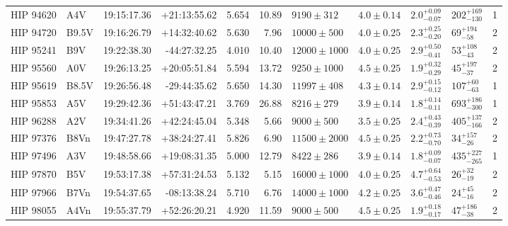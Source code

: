 \begin{landscape}
\begin{scriptsize}
\begin{longtable}{|l|lrrrrlllll|}
   HIP 94620 &      A4V &    19:15:17.36 &   +21:13:55.62 &   5.654 &     10.89 &    $9190 \pm 312$ &  $4.0 \pm 0.14$ &  $2.0^{+0.09}_{-0.07}$ &   $202^{+169}_{-130}$ &       1 \\
   HIP 94720 &    B9.5V &    19:16:26.79 &   +14:32:40.62 &   5.630 &      7.96 &   $10000 \pm 500$ &  $4.0 \pm 0.25$ &  $2.3^{+0.25}_{-0.20}$ &     $69^{+194}_{-58}$ &       2 \\
   HIP 95241 &      B9V &    19:22:38.30 &   -44:27:32.25 &   4.010 &     10.40 &  $12000 \pm 1000$ &  $4.0 \pm 0.25$ &  $2.9^{+0.50}_{-0.41}$ &     $53^{+108}_{-43}$ &       2 \\
   HIP 95560 &      A0V &    19:26:13.25 &   +20:05:51.84 &   5.594 &     13.72 &   $9250 \pm 1000$ &  $4.5 \pm 0.25$ &  $1.9^{+0.32}_{-0.29}$ &     $45^{+197}_{-37}$ &       2 \\
   HIP 95619 &    B8.5V &    19:26:56.48 &   -29:44:35.62 &   5.650 &     14.30 &   $11997 \pm 408$ &  $4.3 \pm 0.14$ &  $2.9^{+0.15}_{-0.12}$ &     $107^{+60}_{-63}$ &       1 \\
   HIP 95853 &      A5V &    19:29:42.36 &   +51:43:47.21 &   3.769 &     26.88 &    $8216 \pm 279$ &  $3.9 \pm 0.14$ &  $1.8^{+0.14}_{-0.11}$ &   $693^{+186}_{-300}$ &       1 \\
   HIP 96288 &      A2V &    19:34:41.26 &   +42:24:45.04 &   5.348 &      5.66 &    $9000 \pm 500$ &  $3.5 \pm 0.25$ &  $2.4^{+0.43}_{-0.39}$ &   $405^{+137}_{-166}$ &       2 \\
   HIP 97376 &     B8Vn &    19:47:27.78 &   +38:24:27.41 &   5.826 &      6.90 &  $11500 \pm 2000$ &  $4.5 \pm 0.25$ &  $2.2^{+0.73}_{-0.70}$ &     $34^{+157}_{-26}$ &       2 \\
   HIP 97496 &      A3V &    19:48:58.66 &   +19:08:31.35 &   5.000 &     12.79 &    $8422 \pm 286$ &  $3.9 \pm 0.14$ &  $1.8^{+0.09}_{-0.07}$ &   $435^{+227}_{-265}$ &       1 \\
   HIP 97870 &      B5V &    19:53:17.38 &   +57:31:24.53 &   5.132 &      5.15 &  $16000 \pm 1000$ &  $4.0 \pm 0.25$ &  $4.7^{+0.64}_{-0.53}$ &      $26^{+32}_{-19}$ &       2 \\
   HIP 97966 &     B7Vn &    19:54:37.65 &   -08:13:38.24 &   5.710 &      6.76 &  $14000 \pm 1000$ &  $4.2 \pm 0.25$ &  $3.6^{+0.47}_{-0.46}$ &      $24^{+45}_{-16}$ &       2 \\
   HIP 98055 &     A4Vn &    19:55:37.79 &   +52:26:20.21 &   4.920 &     11.59 &    $9000 \pm 500$ &  $4.5 \pm 0.25$ &  $1.9^{+0.18}_{-0.17}$ &     $47^{+186}_{-38}$ &       2 \\

\end{longtable}
\end{scriptsize}
\end{landscape}

